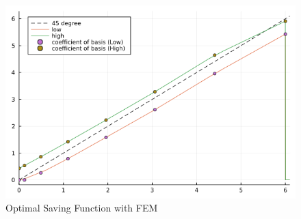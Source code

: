 \documentclass{article}
\begin{document}
	\begin{figure}[htbp]
		\centering
		\includegraphics[scale=0.5]{aiyagari.png}
		\caption{Optimal Saving Function with FEM}
	\end{figure} 
	
	
	
\end{document}
